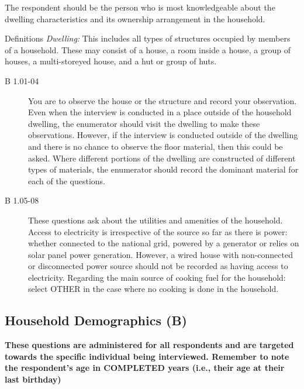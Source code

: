 \documentclass[a4paper]{refart}
\begin{document}
The respondent should be the person who is most knowledgeable about the dwelling characteristics and its ownership arrangement in the household.

Definitions
\textit{Dwelling:} This includes all types of structures occupied by members of a household. These may consist of a house, a room inside a house, a group of houses, a multi-storeyed house, and a hut or group of huts.

\begin{description}
\item[B 1.01-04] You are to observe the house or the structure and record your observation. Even when the interview is conducted in a place outside of the household dwelling, the enumerator should visit the dwelling to make these observations. However, if the interview is conducted outside of the dwelling and there is no chance to observe the floor material, then this could be asked. Where different portions of the dwelling are constructed of different types of materials, the enumerator should record the dominant material for each of the questions.
\item[B 1.05-08] These questions ask about the utilities and amenities of the household. Access to electricity is irrespective of the source so far as there is power: whether connected to the national grid, powered by a generator or relies on solar panel power generation. However, a wired house with non-connected or disconnected power source should not be recorded as having access to electricity. Regarding the main source of cooking fuel for the household: select OTHER in the case where no cooking is done in the household.
\end{description}


\subsection{Household Demographics (B)}
\textbf{These questions are administered for all respondents and are targeted towards the specific individual being interviewed. Remember to note the respondent's age in COMPLETED years (i.e., their age at their last birthday)}
\end{document}
